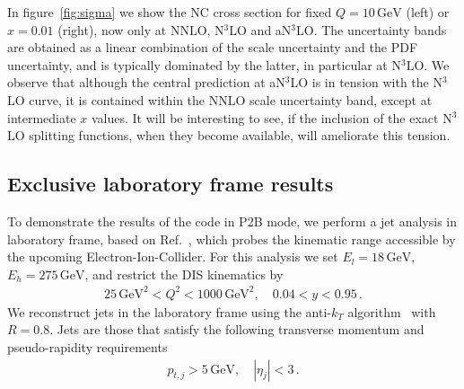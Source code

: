 \documentclass[submission, PhysCodeb]{SciPost}
\newcommand{\GEV}{\,\mathrm{GeV}}
\newcommand{\NNNLO}{N$^3$LO}
\begin{document}
In figure~\ref{fig:sigma} we show the NC cross section for fixed
$Q=10\GEV$ (left) or $x=0.01$ (right), now only at NNLO, \NNNLO{} and
a\NNNLO{}. The uncertainty bands are obtained as a linear combination
of the scale uncertainty and the PDF uncertainty, and is typically
dominated by the latter, in particular at \NNNLO{}. We observe that
although the central prediction at a\NNNLO{} is in tension with the
\NNNLO{} curve, it is contained within the NNLO scale uncertainty
band, except at intermediate $x$ values. It will be interesting to
see, if the inclusion of the exact \NNNLO{} splitting functions, when
they become available, will ameliorate this tension.


\subsection{Exclusive laboratory frame results}
To demonstrate the results of the code in P2B mode, we perform a jet
analysis in laboratory frame, based on Ref.~\cite{Borsa:2022cap}, which
probes the kinematic range accessible by the upcoming
Electron-Ion-Collider. For this analysis we set $E_l=18\GEV$,
$E_h=275\GEV$, and restrict the DIS kinematics by
\begin{align}
  25\GEV^2 < Q^2 < 1000 \GEV^2, \quad 0.04 < y < 0.95\,.
\end{align}
We reconstruct jets in the laboratory frame using the anti-$k_T$
algorithm~\cite{Cacciari:2008gp} with $R=0.8$. Jets are those that
satisfy the following transverse momentum and pseudo-rapidity requirements
\begin{align}
  p_{t,j} > 5 \GEV, \quad |\eta_j| < 3\,.
\end{align}
\end{document}
